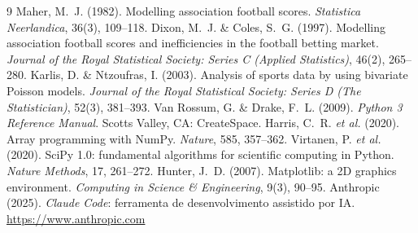 \documentclass[11pt,a4paper]{article}
\begin{document}
\begin{thebibliography}{9}
 Maher, M.~J. (1982). Modelling association football scores.
\emph{Statistica Neerlandica}, 36(3), 109--118.
 Dixon, M.~J. \& Coles, S.~G. (1997). Modelling
association football scores and inefficiencies in the football betting market.
\emph{Journal of the Royal Statistical Society: Series C (Applied Statistics)},
46(2), 265--280.
 Karlis, D. \& Ntzoufras, I. (2003). Analysis of sports data
by using bivariate Poisson models. \emph{Journal of the Royal Statistical
Society: Series D (The Statistician)}, 52(3), 381--393.
 Van Rossum, G. \& Drake, F.~L. (2009). \emph{Python 3 Reference
Manual}. Scotts Valley, CA: CreateSpace.
 Harris, C.~R. \emph{et al.} (2020). Array programming with NumPy.
\emph{Nature}, 585, 357--362.
 Virtanen, P. \emph{et al.} (2020). SciPy 1.0: fundamental
algorithms for scientific computing in Python. \emph{Nature Methods}, 17,
261--272.
 Hunter, J.~D. (2007). Matplotlib: a 2D graphics environment.
\emph{Computing in Science \& Engineering}, 9(3), 90--95.
 Anthropic (2025). \emph{Claude Code}: ferramenta de
desenvolvimento assistido por IA. \url{https://www.anthropic.com}
\end{thebibliography}
\end{document}
